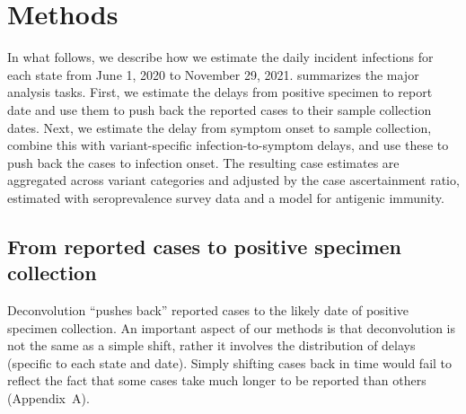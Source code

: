 \section{Methods}
\label{sec:methods}


In what follows, we describe how we estimate the daily incident infections for
each \US state from June 1, 2020 to November 29, 2021.
 summarizes the major
analysis tasks. First, we estimate the delays from positive
specimen to report date and use them to push back the reported cases to their
sample collection dates. Next, we estimate the delay from symptom onset to
sample collection, combine this with variant-specific infection-to-symptom
delays, and use these to push back the cases to infection onset.
The resulting case estimates are aggregated across variant categories
and adjusted by the case ascertainment ratio, estimated with seroprevalence
survey data and a model for antigenic immunity. 

\subsection{From reported cases to positive specimen collection}
\label{sec:step1}

Deconvolution ``pushes back'' reported cases to the likely date of positive
specimen collection. An important aspect of our methods is that deconvolution is
not the same as a simple shift, rather it involves the distribution of delays
(specific to each state and date).
Simply shifting cases back in time would fail to reflect the fact that some cases take
much longer to be reported than others 
(Appendix~A).

